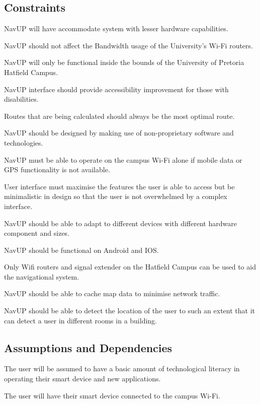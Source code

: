\documentclass[12pt,a4paper]{article}
\begin{document}
	\subsection{Constraints}
		\begin{ConstraintEnum}
			\item NavUP will have accommodate system with lesser hardware capabilities.
			\item NavUP should not affect the Bandwidth usage of the University's Wi-Fi routers.
			\item NavUP will only be functional inside the bounds of the University of Pretoria Hatfield Campus.
			\item NavUP interface should provide accessibility improvement for those with disabilities.
			\item Routes that are being calculated should always be the most optimal route.
			\item NavUP should be designed by making use of non-proprietary software and technologies.
			\item NavUP must be able to operate on the campus Wi-Fi alone if mobile data or GPS functionality is not available.
			\item User interface must maximise the features the user is able to access but be minimalistic in design so that the user is not overwhelmed by a complex interface.
			\item NavUP should be able to adapt to different devices with different hardware component and sizes.
			\item NavUP should be functional on Android and IOS.
			\item Only Wifi routers and signal extender on the Hatfield Campus can be used to aid the navigational system.
			\item NavUP should be able to cache map data to minimise network traffic.
			\item NavUP should be able to detect the location of the user to such an extent that it can detect a user in different rooms in a building.
		\end{ConstraintEnum}
	\subsection{Assumptions and Dependencies}
		\begin{AssumptionsEnum}
			\item The user will be assumed to have a basic amount of technological literacy in operating their smart device and new applications.
		\end{AssumptionsEnum}
		\begin{DependenciesEnum}
			\item The user will have their smart device connected to the campus Wi-Fi.
		\end{DependenciesEnum}
\end{document}
